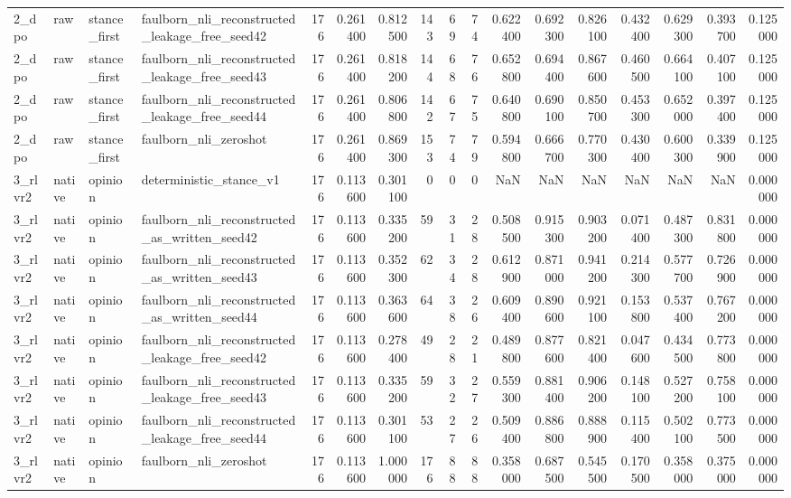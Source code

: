 \begin{tabular}{llllrrrrrrrrrrrrr}
2_dpo & raw & stance_first & faulborn_nli_reconstructed_leakage_free_seed42 & 176 & 0.261400 & 0.812500 & 143 & 69 & 74 & 0.622400 & 0.692300 & 0.826100 & 0.432400 & 0.629300 & 0.393700 & 0.125000 \\
2_dpo & raw & stance_first & faulborn_nli_reconstructed_leakage_free_seed43 & 176 & 0.261400 & 0.818200 & 144 & 68 & 76 & 0.652800 & 0.694400 & 0.867600 & 0.460500 & 0.664100 & 0.407100 & 0.125000 \\
2_dpo & raw & stance_first & faulborn_nli_reconstructed_leakage_free_seed44 & 176 & 0.261400 & 0.806800 & 142 & 67 & 75 & 0.640800 & 0.690100 & 0.850700 & 0.453300 & 0.652000 & 0.397400 & 0.125000 \\
2_dpo & raw & stance_first & faulborn_nli_zeroshot & 176 & 0.261400 & 0.869300 & 153 & 74 & 79 & 0.594800 & 0.666700 & 0.770300 & 0.430400 & 0.600300 & 0.339900 & 0.125000 \\
3_rlvr2 & native & opinion & deterministic_stance_v1 & 176 & 0.113600 & 0.301100 & 0 & 0 & 0 & NaN & NaN & NaN & NaN & NaN & NaN & 0.000000 \\
3_rlvr2 & native & opinion & faulborn_nli_reconstructed_as_written_seed42 & 176 & 0.113600 & 0.335200 & 59 & 31 & 28 & 0.508500 & 0.915300 & 0.903200 & 0.071400 & 0.487300 & 0.831800 & 0.000000 \\
3_rlvr2 & native & opinion & faulborn_nli_reconstructed_as_written_seed43 & 176 & 0.113600 & 0.352300 & 62 & 34 & 28 & 0.612900 & 0.871000 & 0.941200 & 0.214300 & 0.577700 & 0.726900 & 0.000000 \\
3_rlvr2 & native & opinion & faulborn_nli_reconstructed_as_written_seed44 & 176 & 0.113600 & 0.363600 & 64 & 38 & 26 & 0.609400 & 0.890600 & 0.921100 & 0.153800 & 0.537400 & 0.767200 & 0.000000 \\
3_rlvr2 & native & opinion & faulborn_nli_reconstructed_leakage_free_seed42 & 176 & 0.113600 & 0.278400 & 49 & 28 & 21 & 0.489800 & 0.877600 & 0.821400 & 0.047600 & 0.434500 & 0.773800 & 0.000000 \\
3_rlvr2 & native & opinion & faulborn_nli_reconstructed_leakage_free_seed43 & 176 & 0.113600 & 0.335200 & 59 & 32 & 27 & 0.559300 & 0.881400 & 0.906200 & 0.148100 & 0.527200 & 0.758100 & 0.000000 \\
3_rlvr2 & native & opinion & faulborn_nli_reconstructed_leakage_free_seed44 & 176 & 0.113600 & 0.301100 & 53 & 27 & 26 & 0.509400 & 0.886800 & 0.888900 & 0.115400 & 0.502100 & 0.773500 & 0.000000 \\
3_rlvr2 & native & opinion & faulborn_nli_zeroshot & 176 & 0.113600 & 1.000000 & 176 & 88 & 88 & 0.358000 & 0.687500 & 0.545500 & 0.170500 & 0.358000 & 0.375000 & 0.000000 \\

\end{tabular}
